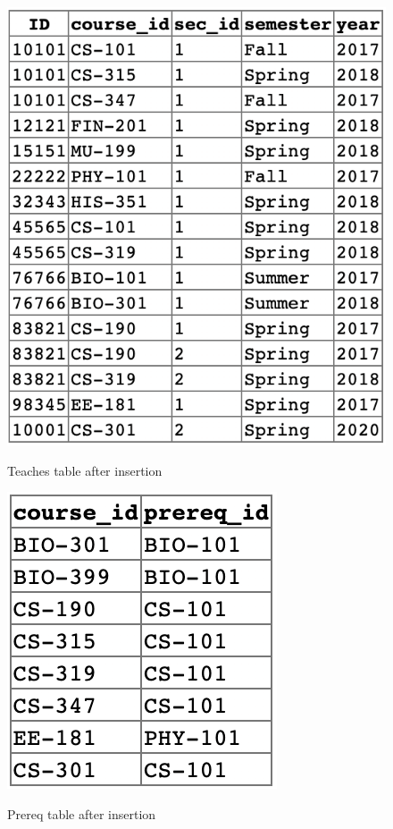 \documentclass[12pt]{article}
\begin{document}
\begin{figure}[!hbt]
    \centering
    \includegraphics[scale=0.9]{screenshots/teaches.png}
    \label{fig:my_label1}
    \caption{Teaches table after insertion}
\end{figure}
\newpage

\begin{figure}[!hbt]
    \centering
    \includegraphics[scale=1.3]{screenshots/prereq.png}
    \label{fig:my_label1}
    \caption{Prereq table after insertion}
\end{figure}
\end{document}
